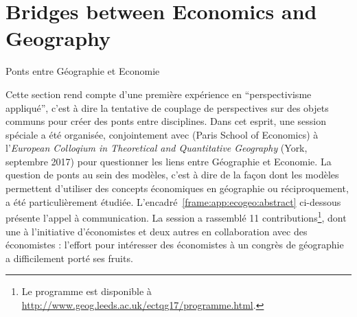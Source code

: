 



\newpage

\section{Bridges between Economics and Geography}{Ponts entre Géographie et Economie}


\label{app:sec:ecogeo}


Cette section rend compte d'une première expérience en ``perspectivisme appliqué'', c'est à dire la tentative de couplage de perspectives sur des objets communs pour créer des ponts entre disciplines. Dans cet esprit, une session spéciale a été organisée, conjointement avec  (Paris School of Economics) à l'\emph{European Colloqium in Theoretical and Quantitative Geography} (York, septembre 2017) pour questionner les liens entre Géographie et Economie. La question de ponts au sein des modèles, c'est à dire de la façon dont les modèles permettent d'utiliser des concepts économiques en géographie ou réciproquement, a été particulièrement étudiée. L'encadré~\ref{frame:app:ecogeo:abstract} ci-dessous présente l'appel à communication. La session a rassemblé 11 contributions\footnote{Le programme est disponible à \url{http://www.geog.leeds.ac.uk/ectqg17/programme.html}.}, dont une à l'initiative d'économistes et deux autres en collaboration avec des économistes : l'effort pour intéresser des économistes à un congrès de géographie a difficilement porté ses fruits.


